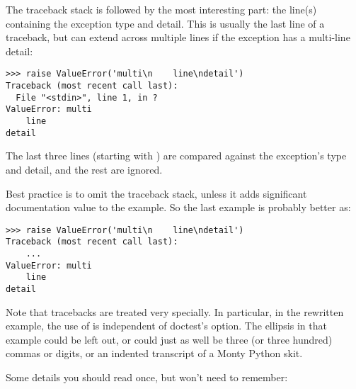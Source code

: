 The traceback stack is followed by the most interesting part:  the
line(s) containing the exception type and detail.  This is usually the
last line of a traceback, but can extend across multiple lines if the
exception has a multi-line detail:

\begin{verbatim}
>>> raise ValueError('multi\n    line\ndetail')
Traceback (most recent call last):
  File "<stdin>", line 1, in ?
ValueError: multi
    line
detail
\end{verbatim}

The last three lines (starting with ) are
compared against the exception's type and detail, and the rest are
ignored.

Best practice is to omit the traceback stack, unless it adds
significant documentation value to the example.  So the last example
is probably better as:

\begin{verbatim}
>>> raise ValueError('multi\n    line\ndetail')
Traceback (most recent call last):
    ...
ValueError: multi
    line
detail
\end{verbatim}

Note that tracebacks are treated very specially.  In particular, in the
rewritten example, the use of  is independent of doctest's
 option.  The ellipsis in that example could be left
out, or could just as well be three (or three hundred) commas or digits,
or an indented transcript of a Monty Python skit.

Some details you should read once, but won't need to remember:

